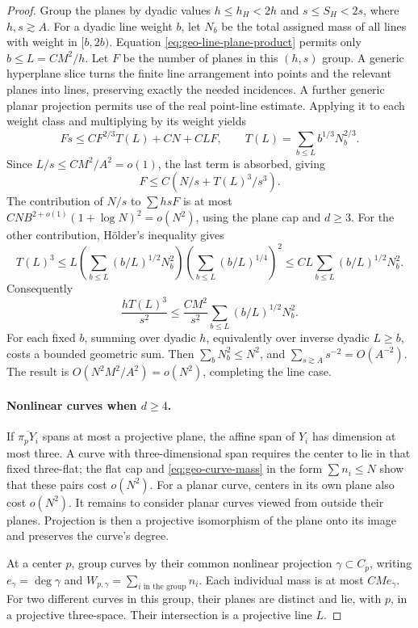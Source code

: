 \begin{proof}
Group the planes by dyadic values $h\le h_H<2h$ and $s\le S_H<2s$, where $h,s\gtrsim A$. For a dyadic line weight $b$, let $N_b$ be the total assigned mass of all lines with weight in $[b,2b)$. Equation \eqref{eq:geo-line-plane-product} permits only $b\le L=CM^2/h$. Let $F$ be the number of planes in this $(h,s)$ group. A generic hyperplane slice turns the finite line arrangement into points and the relevant planes into lines, preserving exactly the needed incidences. A further generic planar projection permits use of the real point-line estimate. Applying it to each weight class and multiplying by its weight yields
\[
 Fs\le C F^{2/3}T(L)+CN+CLF,
 \qquad T(L)=\sum_{b\le L}b^{1/3}N_b^{2/3}.
\]
Since $L/s\le CM^2/A^2=o(1)$, the last term is absorbed, giving
\begin{equation}\label{eq:geo-weighted-plane-count}
 F\le C\left(N/s+T(L)^3/s^3\right).
\end{equation}
The contribution of $N/s$ to $\sum hsF$ is at most $CN B^{2+o(1)}(1+\log N)^2=o(N^2)$, using the plane cap and $d\ge3$. For the other contribution, H\"older's inequality gives
\[
 T(L)^3\le
 L\left(\sum_{b\le L}(b/L)^{1/2}N_b^2\right)
   \left(\sum_{b\le L}(b/L)^{1/4}\right)^2
 \le C L\sum_{b\le L}(b/L)^{1/2}N_b^2.
\]
Consequently
\[
 \frac{hT(L)^3}{s^2}
 \le\frac{CM^2}{s^2}
       \sum_{b\le L}(b/L)^{1/2}N_b^2.
\]
For each fixed $b$, summing over dyadic $h$, equivalently over inverse dyadic $L\ge b$, costs a bounded geometric sum. Then $\sum_bN_b^2\le N^2$, and $\sum_{s\gtrsim A}s^{-2}=O(A^{-2})$. The result is $O(N^2M^2/A^2)=o(N^2)$, completing the line case.

\paragraph{Nonlinear curves when $d\ge4$.}
If $\overline{\pi_pY_i}$ spans at most a projective plane, the affine span of $Y_i$ has dimension at most three. A curve with three-dimensional span requires the center to lie in that fixed three-flat; the flat cap and \eqref{eq:geo-curve-mass} in the form $\sum n_i\le N$ show that these pairs cost $o(N^2)$. For a planar curve, centers in its own plane also cost $o(N^2)$. It remains to consider planar curves viewed from outside their planes. Projection is then a projective isomorphism of the plane onto its image and preserves the curve's degree.

At a center $p$, group curves by their common nonlinear projection $\gamma\subset C_p$, writing $e_\gamma=\deg\gamma$ and $W_{p,\gamma}=\sum_{i\text{ in the group}}n_i$. Each individual mass is at most $CMe_\gamma$. For two different curves in this group, their planes are distinct and lie, with $p$, in a projective three-space. Their intersection is a projective line $L$.


\end{proof}
